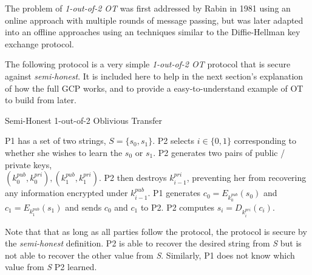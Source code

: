 The problem of \emph{1-out-of-2 \ac{OT}} was first addressed by Rabin\cite{rabin2005exchange} in 1981 using an online approach with multiple rounds of message passing, but was later adapted into an offline approaches using an techniques similar to the Diffie-Hellman key exchange protocol\cite{diffie1976new}.

The following protocol\cite{lindell2013technion} is a very simple \emph{1-out-of-2 \ac{OT}} protocol that is secure against \emph{semi-honest}. It is included here to help in the next section's explanation of how the full \ac{GCP} works, and to provide a easy-to-understand example of \ac{OT} to build from later.

\begin{algorithm}[H]
    \caption{Semi-Honest 1-out-of-2 Oblivious Transfer}
    \label{alg:otsemihonest}
    \begin{algorithmic}[1]
        \STATE \ac{P1} has a set of two strings, $S = \{s_0, s_1\}$.
        \STATE \ac{P2} selects $i \in \{0, 1\}$ corresponding to whether she wishes to learn the $s_0$ or $s_1$.
        \STATE \ac{P2} generates two pairs of public / private keys,\\
        $(k^{pub}_0, k^{pri}_0), (k^{pub}_1, k^{pri}_1)$.
        \STATE \ac{P2} then destroys $k^{pri}_{i-1}$, preventing her from recovering any information encrypted under $k^{pub}_{i-1}$.
        \STATE \ac{P1} generates $c_0 = E_{k^{pub}_0}(s_0)$ and $c_1 = E_{k^{pub}_1}(s_1)$ and sends $c_0$ and $c_1$ to \ac{P2}.
        \STATE \ac{P2} computes $s_i = D_{k^{pri}_i}(c_i)$.
    \end{algorithmic}
\end{algorithm}

Note that that as long as all parties follow the protocol, the protocol is secure by the \emph{semi-honest} definition. \ac{P2} is able to recover the desired string from \emph{S} but is not able to recover the other value from \emph{S}. Similarly, \ac{P1} does not know which value from \emph{S} \ac{P2} learned.
